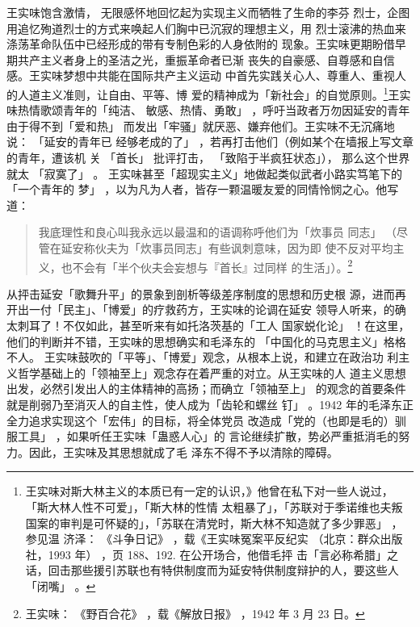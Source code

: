 王实味饱含激情，
无限感怀地回忆起为实现主义而牺牲了生命的李芬
烈士，企图用追忆殉道烈士的方式来唤起人们胸中已沉寂的理想主义，用
烈士滚沸的热血来涤荡革命队伍中已经形成的带有专制色彩的人身依附的
现象。王实味更期盼借早期共产主义者身上的圣洁之光，重振革命者已渐
丧失的自豪感、自尊感和自信感。王实味梦想中共能在国际共产主义运动
中首先实践关心人、尊重人、重视人的人道主义准则，让自由、平等、博
爱的精神成为「新社会」的自觉原则。\footnote{王实味对斯大林主义的本质已有一定的认识，》他曾在私下对一些人说过，
「斯大林人性不可爱」，「斯大林的性情
太粗暴了」，「苏联对于季诺维也夫叛国案的审判是可怀疑的」，「苏联在清党时，斯大林不知造就了多少罪恶」
，参见温
济泽：
《斗争日记》
，载《王实味冤案平反纪实
（北京：群众出版社，1993 年）
，页 188、192.  在公开场合，他借毛抨
击「言必称希腊」之话，回击那些援引苏联也有特供制度而为延安特供制度辩护的人，要这些人「闭嘴」
。}王实味热情歌颂青年的「纯洁、
敏感、热情、勇敢」
，呼吁当政者万勿因延安的青年由于得不到「爱和热」
而发出「牢骚」就厌恶、嫌弃他们。王实味不无沉痛地说：
「延安的青年已
经够老成的了」
，若再打击他们（例如某个在墙报上写文章的青年，遭该机
关
「首长」
批评打击，
「致陷于半疯狂状态」），
 那么这个世界就太
「寂寞了」
。
王实味甚至「超现实主义」地做起类似武者小路实笃笔下的「一个青年的
梦」
，以为凡为人者，皆存一颗温暖友爱的同情怜悯之心。他写道：
\begin{quote}
{\fzwkai 我底理性和良心叫我永远以最温和的语调称呼他们为「炊事员
同志」
（尽管在延安称伙夫为「炊事员同志」有些讽刺意味，因为即
使不反对平均主义，也不会有「半个伙夫会妄想与『首长』过同样
的生活」）。\footnote{王实味：
《野百合花》
，载《解放日报》
，1942 年 3 月 23 日。} } 
\end{quote}
从抨击延安「歌舞升平」的景象到剖析等级差序制度的思想和历史根
源，进而再开出一付「民主」、「博爱」的疗救药方，王实味的论调在延安
领导人听来，的确太刺耳了！不仅如此，甚至听来有如托洛茨基的「工人
国家蜕化论」
！在这里，他们的判断并不错，王实味的思想确实和毛泽东的
「中国化的马克思主义」格格不人。
王实味鼓吹的「平等」、「博爱」观念，从根本上说，和建立在政治功
利主义哲学基础上的「领袖至上」观念存在着严重的对立。从王实味的人
道主义思想出发，必然引发出人的主体精神的高扬；而确立「领袖至上」
的观念的首要条件就是削弱乃至消灭人的自主性，使人成为「齿轮和螺丝
钉」
。1942 年的毛泽东正全力追求实现这个「宏伟」的目标，将全体党员
改造成「党的（也即是毛的）驯服工具」
，如果听任王实味「蛊惑人心」的
言论继续扩散，势必严重抵消毛的努力。因此，王实味及其思想就成了毛
泽东不得不予以清除的障碍。

